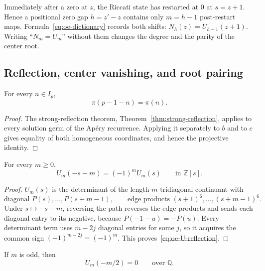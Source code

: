 \begin{remark}\label{rem:oe-one-step-shift}
Immediately after a zero at $z$, the Riccati state has restarted at $0$ at
$s=z+1$.  Hence a positional zero gap $h=z'-z$ contains only $m=h-1$
post-restart maps.  Formula~\eqref{eq:oe-dictionary} records both shifts:
$N_h(z)=U_{h-1}(z+1)$.  Writing ``$N_m=U_m$'' without them changes the
degree and the parity of the center root.
\end{remark}

\subsection{Reflection, center vanishing, and root pairing}

\begin{theorem}\label{thm:oe-orbit-reflection}
For every $n\in I_p$,
\[
 \boxed{\pi(p-1-n)=\pi(n).}
\]
\end{theorem}

\begin{proof}
The strong-reflection theorem, Theorem~\ref{thm:strong-reflection}, applies
to every solution germ of the Ap\'ery recurrence.  Applying it separately
to $b$ and to $c$ gives equality of both homogeneous coordinates, and hence
the projective identity.
\end{proof}

\begin{lemma}\label{lem:oe-U-reflection}
For every $m\ge0$,
\begin{equation}\label{eq:oe-U-reflection}
 U_m(-s-m)=(-1)^mU_m(s)
 \qquad\text{in }\mathbb Z[s].
\end{equation}
\end{lemma}

\begin{proof}
$U_m(s)$ is the determinant of the length-$m$ tridiagonal continuant with
\[
 \text{diagonal }P(s),\ldots,P(s+m-1),\qquad
 \text{edge products }(s+1)^6,\ldots,(s+m-1)^6.
\]
Under $s\mapsto-s-m$, reversing the path reverses the edge products and
sends each diagonal entry to its negative, because $P(-1-u)=-P(u)$.
Every determinant term uses
$m-2j$ diagonal entries for some $j$, so it acquires the common sign
$(-1)^{m-2j}=(-1)^m$.  This proves~\eqref{eq:oe-U-reflection}.
\end{proof}

\begin{corollary}\label{cor:oe-center-vanishing}
If $m$ is odd, then
\[
 U_m(-m/2)=0
 \qquad\text{over }\mathbb Q.
\]
\end{corollary}

